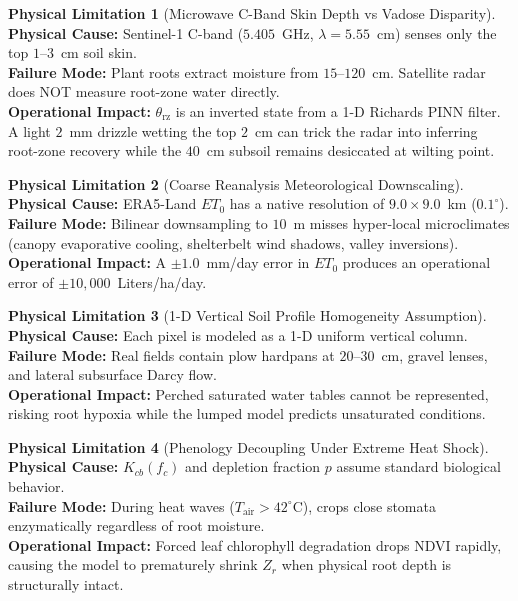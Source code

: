 \documentclass[11pt,a4paper]{article}
\theoremstyle{definition}
\newtheorem{limitation}{Physical Limitation}[section]
\theoremstyle{remark}
\begin{document}
\begin{limitation}[Microwave C-Band Skin Depth vs Vadose Disparity]
\textbf{Physical Cause:} Sentinel-1 C-band ($5.405$~GHz, $\lambda = 5.55$~cm) senses only the top $1$--$3$~cm soil skin. \\
\textbf{Failure Mode:} Plant roots extract moisture from $15$--$120$~cm. Satellite radar does NOT measure root-zone water directly. \\
\textbf{Operational Impact:} $\theta_{\text{rz}}$ is an inverted state from a 1-D Richards PINN filter. A light $2$~mm drizzle wetting the top $2$~cm can trick the radar into inferring root-zone recovery while the $40$~cm subsoil remains desiccated at wilting point.
\end{limitation}

\begin{limitation}[Coarse Reanalysis Meteorological Downscaling]
\textbf{Physical Cause:} ERA5-Land $ET_0$ has a native resolution of $9.0 \times 9.0$~km ($0.1^\circ$). \\
\textbf{Failure Mode:} Bilinear downsampling to $10$~m misses hyper-local microclimates (canopy evaporative cooling, shelterbelt wind shadows, valley inversions). \\
\textbf{Operational Impact:} A $\pm 1.0$~mm/day error in $ET_0$ produces an operational error of $\pm 10,000$~Liters/ha/day.
\end{limitation}

\begin{limitation}[1-D Vertical Soil Profile Homogeneity Assumption]
\textbf{Physical Cause:} Each pixel is modeled as a 1-D uniform vertical column. \\
\textbf{Failure Mode:} Real fields contain plow hardpans at $20$--$30$~cm, gravel lenses, and lateral subsurface Darcy flow. \\
\textbf{Operational Impact:} Perched saturated water tables cannot be represented, risking root hypoxia while the lumped model predicts unsaturated conditions.
\end{limitation}

\begin{limitation}[Phenology Decoupling Under Extreme Heat Shock]
\textbf{Physical Cause:} $K_{cb}(f_c)$ and depletion fraction $p$ assume standard biological behavior. \\
\textbf{Failure Mode:} During heat waves ($T_{\text{air}} > 42^\circ\text{C}$), crops close stomata enzymatically regardless of root moisture. \\
\textbf{Operational Impact:} Forced leaf chlorophyll degradation drops NDVI rapidly, causing the model to prematurely shrink $Z_r$ when physical root depth is structurally intact.
\end{limitation}
\end{document}
